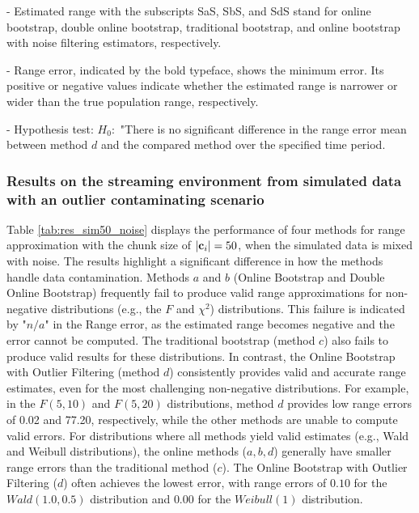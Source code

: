 \documentclass[a4paper,fleqn]{cas-dc}
\begin{document}
\begin{table}[h!]
\begin{threeparttable}
\begin{tabular}{|c|c|c|c|c|c|}
\bottomrule
\end{tabular}
\begin{tablenotes}
          \scriptsize
          \item - Estimated range with the subscripts SaS, SbS, and SdS stand for online bootstrap, double online bootstrap, traditional bootstrap, and online bootstrap with noise filtering estimators, respectively.
          \item - Range error, indicated by the bold typeface, shows the minimum error. Its positive or negative values indicate whether the estimated range is narrower or wider than the true population range, respectively.
         \item - Hypothesis test: $H_0:$ "There is no significant difference in the range error mean between method $d$ and 
         the compared method over the specified time period.
    \end{tablenotes}
\end{threeparttable}
\end{table}

\subsubsection{Results on the streaming environment from simulated data with an outlier contaminating scenario}



Table \ref{tab:res_sim50_noise} displays the performance of four methods for 
range approximation with the chunk size of $|{\bf c}_i|=50$, when the simulated data is mixed with noise. 
The results highlight a significant difference in how the methods handle data contamination. 
Methods $a$ and $b$ (Online Bootstrap and Double Online Bootstrap) frequently fail to produce 
 valid range approximations for non-negative distributions (e.g., the $F$ and $\chi^2$) distributions.
This failure is indicated by "$n/a$" in the Range error, 
as the estimated range becomes negative and the error cannot be computed. The traditional bootstrap (method $c$) also fails to 
produce valid results for these distributions. In contrast, the Online Bootstrap with Outlier Filtering 
(method $d$) consistently provides valid and accurate range estimates, even for the most challenging 
non-negative distributions. For example, in the $F(5,10)$ and $F(5,20)$ distributions, method $d$ 
provides  low range errors of 0.02 and 77.20, respectively, while the other methods are unable to 
compute valid errors. For distributions where all methods yield valid estimates (e.g., Wald and Weibull distributions), 
the online methods ($a, b, d$) generally have smaller range errors than the traditional method ($c$). 
The Online Bootstrap with Outlier Filtering ($d$) often achieves the lowest error, with range errors 
of $0.10$ for the $Wald(1.0, 0.5)$ distribution and $0.00$ for the $Weibull(1)$ distribution.
\end{document}
